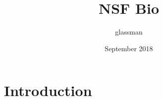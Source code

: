 \documentclass{article}
\title{NSF Bio}
\author{glassman }
\date{September 2018}
\begin{document}
\maketitle

\section{Introduction}
\end{document}
